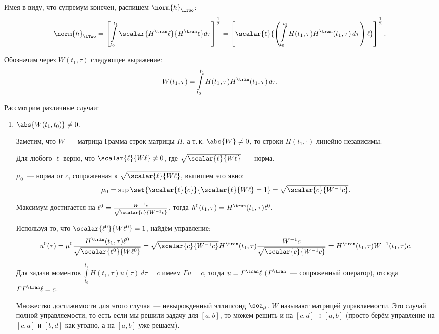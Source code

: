 Имея в виду, что супремум конечен, распишем $\norm{h}_\LTwo$:
\begin{equation*}
	\norm{h}_\LTwo =
	\left[
	  \int\limits_{t_0}^{t_1} \scalar{H^\tran \ell}{H^\tran \ell} d\tau
	\right]^{\tfrac{1}{2}} =
	\left[
	  \scalar{\ell}{\left(
	    \int\limits_{t_0}^{t_1}H(t_1, \tau) H^\tran(t_1, \tau) \, d\tau
	  \right) \ell}
	\right]^{\tfrac{1}{2}}.
\end{equation*}

Обозначим через $W(t_1, \tau)$ следующее выражение:
\begin{equation*}
	W(t_1, \tau) = \int\limits_{t_0}^{t_1} H(t_1, \tau) H^\tran(t_1, \tau) \, d\tau.
\end{equation*}

Рассмотрим различные случаи:

\begin{enumerate}
	\item $\abs{W(t_1, t_0)} \neq 0$.

	Заметим, что $W$~--- матрица Грамма строк матрицы $H$, а т.\,к. $\abs{W} \neq 0$,
	то строки $H(t_1, \cdot)$ линейно независимы.

	Для любого $\ell$ верно, что $\scalar{\ell}{W \ell} \neq 0$,
	где $\sqrt{\scalar{\ell}{W \ell}}$~--- норма.

	$\mu_0$~--- норма от $c$, сопряженная к $\sqrt{\scalar{\ell}{W \ell}}$, выпишем это явно:
	\begin{equation*}
		\mu_0 = \sup \set{\scalar{\ell}{c}}{\scalar{\ell}{W \ell} = 1} = \sqrt{\scalar{c}{W^{-1} c}}.
	\end{equation*}

	Максимум достигается на
	$\ell^0 = \frac{W^{-1} c}{\sqrt{\scalar{c}{W^{-1} c}}}$,
	тогда $h^0(t_1, \tau) = H^\tran(t_1, \tau) \ell^0$.

	Используя то, что $\scalar{\ell^0}{W \ell^0} = 1$, найдём управление:
	\begin{equation*}
		u^0(\tau) = \mu^0 \frac{H^\tran(t_1, \tau) \ell^0}{\sqrt{\scalar{\ell^0}{W \ell^0}}} =
		\sqrt{\scalar{c}{W^{-1} c}} H^\tran(t_1, \tau) \frac{W^{-1} c}{\sqrt{\scalar{c}{W^{-1} c}}} =
		H^\tran(t_1, \tau) W^{-1}(t_1, \tau) c.
	\end{equation*}

	Для задачи моментов $\displaystyle\int\limits_{t_0}^{t_1} H(t_1, \tau) u(\tau) \, d\tau = c$
	имеем $\varGamma u = c$, тогда $u = \varGamma^\tran \ell$
	($\varGamma^\tran$~--- сопряженный оператор), отсюда $\varGamma \varGamma^\tran \ell = c$.

	Множество достижимости для этого случая~--- невырожденный эллипсоид $\soa_\mu$.
	$W$ называют матрицей управляемости. Это случай полной управляемости,
	то есть если мы решили задачу для $[a, b]$, то можем решить и на
	$[c, d] \supset [a, b]$ (просто берём управление на $[c, a]$ и $[b, d]$ как угодно,
	а на $[a, b]$ уже решаем).


\end{enumerate}
